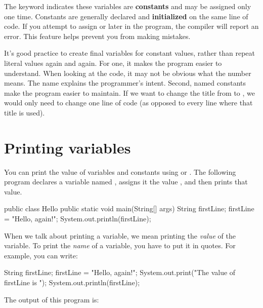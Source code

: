 
The keyword  indicates these variables are {\bf constants} and may be assigned only one time.
Constants are generally declared and {\bf initialized} on the same line of code.
If you attempt to assign  or  later in the program, the compiler will report an error.
This feature helps prevent you from making mistakes.

It's good practice to create final variables for constant values, rather than repeat literal values again and again.
For one, it makes the program easier to understand.
When looking at the code, it may not be obvious what the number  means.
The name  explains the programmer's intent.
Second, named constants make the program easier to maintain.
If we want to change the title from  to , we would only need to change one line of code (as opposed to every line where that title is used).


\section{Printing variables}
\label{printing}

You can print the value of variables and constants using  or .
The following program declares a variable named , assigns it the value , and then prints that value.

\begin{code}
public class Hello {
    public static void main(String[] args) {
        String firstLine;
        firstLine = "Hello, again!";
        System.out.println(firstLine);
    }
}
\end{code}

When we talk about printing a variable, we mean printing the {\em value} of the variable.
To print the {\em name} of a variable, you have to put it in quotes.
For example, you can write:

\begin{code}
    String firstLine;
    firstLine = "Hello, again!";
    System.out.print("The value of firstLine is ");
    System.out.println(firstLine);
\end{code}

The output of this program is:

